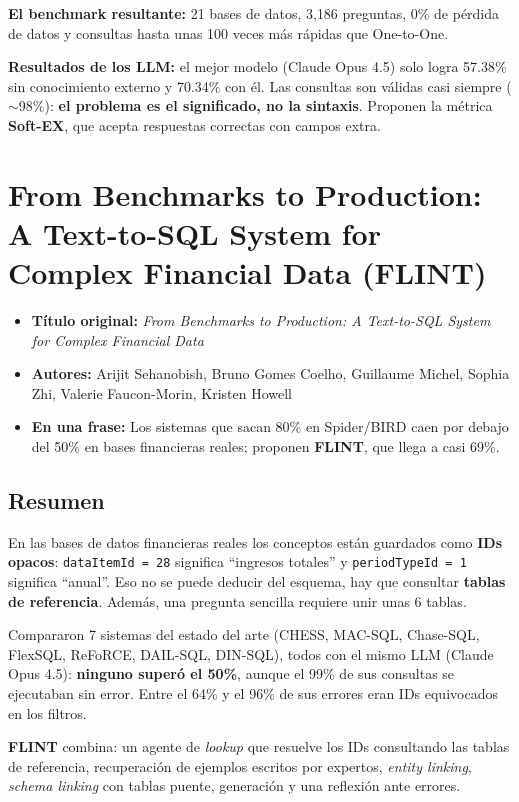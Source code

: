 \documentclass[11pt,a4paper]{article}
\newcommand{\ficha}[5]{%
  \begin{itemize}[leftmargin=*, label={}]
    \item \textbf{Título original:} \textit{#1}
    \item \textbf{Autores:} #2
    \item \textbf{En una frase:} #5
  \end{itemize}
}
\begin{document}
\textbf{El benchmark resultante:} 21 bases de datos, 3{,}186 preguntas, 0\% de pérdida de datos y consultas hasta unas 100 veces más rápidas que One-to-One.

\textbf{Resultados de los LLM:} el mejor modelo (Claude Opus 4.5) solo logra 57.38\% sin conocimiento externo y 70.34\% con él. Las consultas son válidas casi siempre ($\sim$98\%): \textbf{el problema es el significado, no la sintaxis}. Proponen la métrica \textbf{Soft-EX}, que acepta respuestas correctas con campos extra.

\section{From Benchmarks to Production: A Text-to-SQL System for Complex Financial Data (FLINT)}
\ficha
  {From Benchmarks to Production: A Text-to-SQL System for Complex Financial Data}
  {Arijit Sehanobish, Bruno Gomes Coelho, Guillaume Michel, Sophia Zhi, Valerie Faucon-Morin, Kristen Howell}
  {Kensho Technologies}
  {arXiv:2610.03524 (preprint), octubre 2026}
  {Los sistemas que sacan 80\% en Spider/BIRD caen por debajo del 50\% en bases financieras reales; proponen \textbf{FLINT}, que llega a casi 69\%.}

\subsection*{Resumen}
En las bases de datos financieras reales los conceptos están guardados como \textbf{IDs opacos}: \texttt{dataItemId = 28} significa ``ingresos totales'' y \texttt{periodTypeId = 1} significa ``anual''. Eso no se puede deducir del esquema, hay que consultar \textbf{tablas de referencia}. Además, una pregunta sencilla requiere unir unas 6 tablas.

Compararon 7 sistemas del estado del arte (CHESS, MAC-SQL, Chase-SQL, FlexSQL, ReFoRCE, DAIL-SQL, DIN-SQL), todos con el mismo LLM (Claude Opus 4.5): \textbf{ninguno superó el 50\%}, aunque el 99\% de sus consultas se ejecutaban sin error. Entre el 64\% y el 96\% de sus errores eran IDs equivocados en los filtros.

\textbf{FLINT} combina: un agente de \textit{lookup} que resuelve los IDs consultando las tablas de referencia, recuperación de ejemplos escritos por expertos, \textit{entity linking}, \textit{schema linking} con tablas puente, generación y una reflexión ante errores.
\end{document}
